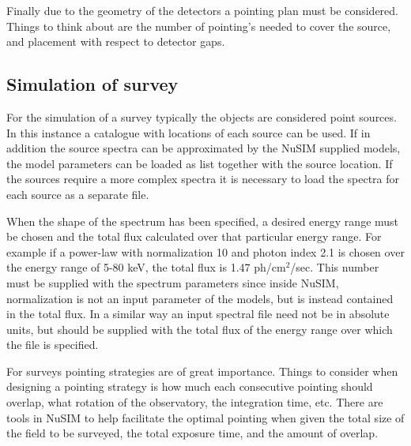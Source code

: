 \documentclass[11pt]{article}
\begin{document}
Finally due to the geometry of the detectors a pointing plan must be considered. Things to think about are the number of pointing's needed to cover the source, and placement with respect to detector gaps.

\subsection{Simulation of survey}
For the simulation of a survey typically the objects are considered point sources. In this instance a catalogue with locations of each source can be used. If in addition the source spectra can be approximated by the NuSIM supplied models, the model parameters can be loaded as list together with the source location. If the sources require a more complex spectra it is necessary to load the spectra for each source as a separate file.

When the shape of the spectrum has been specified, a desired energy range must be chosen and the total flux calculated over that particular energy range. For example if a power-law with normalization 10 and photon index 2.1 is chosen over the energy range of 5-80 keV, the total flux is 1.47 ph/cm$^2$/sec. This number must be supplied with the spectrum parameters since inside NuSIM, normalization is not an input parameter of the models, but is instead contained in the total flux. In a similar way an input spectral file need not be in absolute units, but should be supplied with the total flux of the energy range over which the file is specified.

For surveys pointing strategies are of great importance. Things to consider when designing a pointing strategy is how much each consecutive pointing should overlap, what rotation of the observatory, the integration time, etc. There are tools in NuSIM to help facilitate the optimal pointing when given the total size of the field to be surveyed, the total exposure time, and the amount of overlap.
\end{document}
